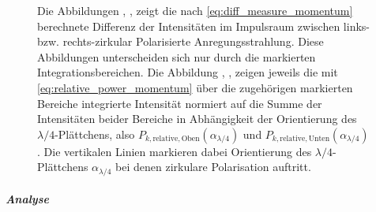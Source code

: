 \documentclass[titlepage,  ngerman]{article}
\begin{document}
\begin{figure}
			\caption[PSHE Messung]{Die Abbildungen , ,  zeigt die nach \eqref{eq:diff_measure_momentum} berechnete Differenz der Intensitäten im Impulsraum zwischen links- bzw. rechts-zirkular Polarisierte Anregungsstrahlung. Diese Abbildungen unterscheiden sich nur durch die markierten Integrationsbereichen. Die Abbildung , ,  zeigen jeweils die mit \eqref{eq:relative_power_momentum} über die zugehörigen markierten Bereiche integrierte Intensität normiert auf die Summe der Intensitäten beider Bereiche in Abhängigkeit der Orientierung des $\lambda/4$-Plättchens, also $P_{k, \mathrm{relative}, \mathrm{Oben}}(\alpha_{\lambda/4})$ und $P_{k, \mathrm{relative}, \mathrm{Unten}}(\alpha_{\lambda/4})$. Die vertikalen Linien markieren dabei  Orientierung des $\lambda/4$-Plättchens $\alpha_{\lambda/4}$ bei denen zirkulare Polarisation auftritt.}	
			\label{fig:spin_hall_measure}	
		\end{figure}
		\subparagraph{Analyse}
\end{document}
